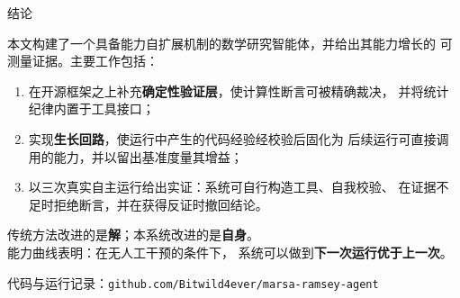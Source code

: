 \documentclass[aspectratio=169,11pt]{beamer}
\begin{document}
\begin{frame}{结论}
  \begin{block}{}
    \normalsize
    本文构建了一个具备能力自扩展机制的数学研究智能体，并给出其能力增长的
    可测量证据。主要工作包括：
    \begin{enumerate}
      \item 在开源框架之上补充\textbf{确定性验证层}，使计算性断言可被精确裁决，
        并将统计纪律内置于工具接口；
      \item 实现\textbf{生长回路}，使运行中产生的代码经验经校验后固化为
        后续运行可直接调用的能力，并以留出基准度量其增益；
      \item 以三次真实自主运行给出实证：系统可自行构造工具、自我校验、
        在证据不足时拒绝断言，并在获得反证时撤回结论。
    \end{enumerate}
  \end{block}

  \vspace{0.6em}
  \begin{block}{}
    \normalsize
    \centering
    传统方法改进的是\textbf{解}；本系统改进的是\textbf{自身}。\\[0.35em]
    能力曲线表明：在无人工干预的条件下，
    系统可以做到\textbf{下一次运行优于上一次}。
  \end{block}

  \vspace{0.4em}
  \footnotesize\color{black!60}
  代码与运行记录：\texttt{github.com/Bitwild4ever/marsa-ramsey-agent}
\end{frame}
\end{document}
